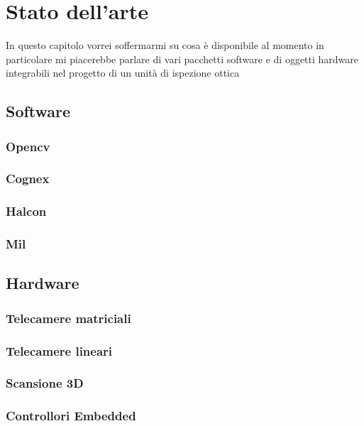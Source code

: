 \chapter{Stato dell'arte}
In questo capitolo vorrei soffermarmi su cosa è disponibile al momento
in particolare mi piacerebbe parlare di vari pacchetti software e di oggetti
hardware integrabili nel progetto di un unità di ispezione ottica

\section{Software}
\subsection{Opencv}
\subsection{Cognex}
\subsection{Halcon}
\subsection{Mil}

\section{Hardware}
\subsection{Telecamere matriciali}
\subsection{Telecamere lineari}
\subsection{Scansione 3D}
\subsection{Controllori Embedded}

\endinput